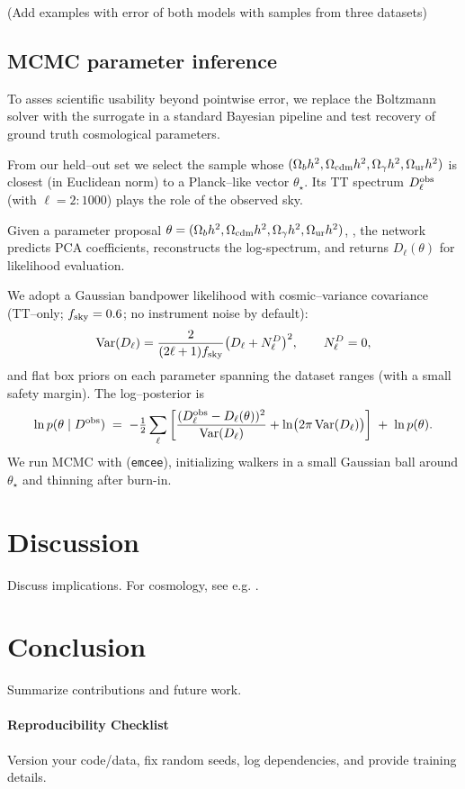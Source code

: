 \documentclass[11pt,a4paper]{article}
\numberwithin{equation}{section}
\begin{document}
(Add examples with error of both models with samples from three datasets)

\subsection{MCMC parameter inference}
\label{sec:mcmc}

To asses scientific usability beyond pointwise error,
we replace the Boltzmann solver with the surrogate in 
a standard Bayesian pipeline and test recovery of ground 
truth cosmological parameters.

From our held--out set we select the sample whose $(\Omega_b h^2,\Omega_{\rm cdm} h^2,\Omega_\gamma h^2,\Omega_{\rm ur} h^2)$ is closest (in Euclidean norm) to a Planck--like vector $\theta_\star$. Its TT spectrum $D_\ell^{\rm obs}$ (with $\ell=2\!:\!1000$) plays the role of the observed sky.

Given a parameter proposal $\theta=(\Omega_b h^2,\Omega_{\rm cdm} h^2,\Omega_\gamma h^2,\Omega_{\rm ur} h^2)$, , the network predicts PCA coefficients, reconstructs the log-spectrum, and returns $D_\ell(\theta)$ for likelihood evaluation.

We adopt a Gaussian bandpower likelihood with cosmic--variance covariance (TT--only; $f_{\rm sky}=0.6$; no instrument noise by default):
\[
\mathrm{Var}(D_\ell)=\frac{2}{(2\ell+1)f_{\rm sky}}\big(D_\ell+N_\ell^D\big)^2,\qquad N_\ell^D=0,
\]
and flat box priors on each parameter spanning the dataset ranges (with a small safety margin). The log--posterior is
\[
\ln p(\theta\mid D^{\rm obs}) \;=\; -\tfrac12\sum_\ell
\left[\frac{(D_\ell^{\rm obs}-D_\ell(\theta))^2}{\mathrm{Var}(D_\ell)}+\ln\!\big(2\pi\,\mathrm{Var}(D_\ell)\big)\right]
\;+\;\ln p(\theta).
\]
We run MCMC with (\texttt{emcee}), initializing walkers in a small Gaussian ball around $\theta_\star$ and thinning after burn-in.

\section{Discussion}
Discuss implications. For cosmology, see e.g. \citep{planck2018parameters,camb}.

\section{Conclusion}
Summarize contributions and future work.

\paragraph{Reproducibility Checklist}
Version your code/data, fix random seeds, log dependencies, and provide training details.
\end{document}
